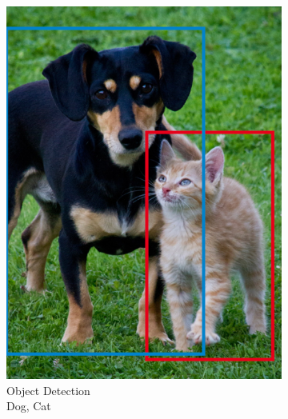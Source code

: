 \begin{figure}
\begin{subfigure}{0.24\linewidth}
			\includegraphics[width=\linewidth]{img/compressed-dog-and-cat-detected.png}
			\caption{Object Detection \\ {\color{TUDa-2b} Dog}, {\color{TUDa-9b} Cat}}
		\end{subfigure}
		\begin{subfigure}{0.24\linewidth}
			\captionsetup{justification=centering}
			\centering

\end{subfigure}
\end{figure}

